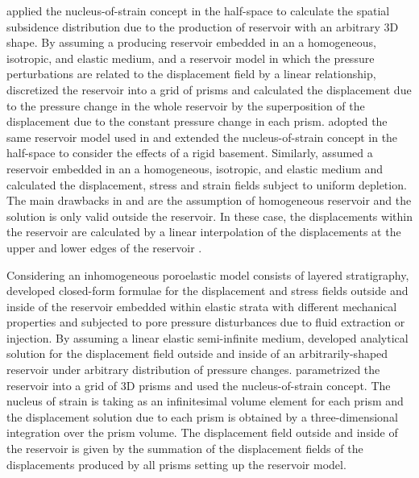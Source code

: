 \documentclass[journal abbreviation, manuscript]{copernicus}
\begin{document}
\cite{Geertsma&Opstal73} applied the nucleus-of-strain concept in the half-space 
to calculate the spatial subsidence distribution due to the production of reservoir with an arbitrary 3D shape.
By assuming a producing reservoir embedded in an a homogeneous, isotropic, and elastic medium, and a reservoir model in which the pressure perturbations are related to the displacement field by a linear relationship, \cite{Geertsma&Opstal73} discretized the reservoir into a grid of  prisms and calculated the displacement due to the pressure change in the whole reservoir  by the superposition of the displacement due to the constant pressure change in each prism.
\cite{Tempone10} adopted the same reservoir model used in \cite{Geertsma&Opstal73} and 
extended the nucleus-of-strain concept in the half-space to consider the effects of a rigid basement. 
Similarly, \cite{Tempone10} assumed a reservoir embedded in an a homogeneous, isotropic, and elastic medium and calculated the displacement, stress and strain fields subject to uniform depletion.
The main drawbacks in \cite{Geertsma&Opstal73} and \cite{Tempone10} are the assumption of homogeneous reservoir and the solution is only valid outside the reservoir.
In these case, the displacements within the reservoir are calculated by a linear interpolation of the displacements at the upper and lower edges of the reservoir \citep{Tempone12}.

Considering an inhomogeneous poroelastic model consists of layered stratigraphy, \cite{Mehrabian&Abousleiman15} developed closed-form formulae for the  displacement and stress  fields outside and inside of the reservoir embedded within elastic strata with different mechanical properties and subjected to pore pressure disturbances due to fluid extraction or injection. 
By assuming a linear elastic semi-infinite medium, \cite{Munoz&Roehl17} developed analytical solution for the  displacement field  outside and inside of an arbitrarily-shaped reservoir under arbitrary distribution of pressure changes. 
\cite{Munoz&Roehl17} parametrized the reservoir into a grid of 3D prisms and used the nucleus-of-strain concept. 
The nucleus of strain is taking as an infinitesimal volume element  for each prism and the displacement solution due to each prism is obtained by a three-dimensional integration over the prism volume. 
The displacement field outside and inside of the reservoir is given by the summation of the displacement fields of the displacements produced by all prisms setting up the reservoir model.
 
\end{document}
